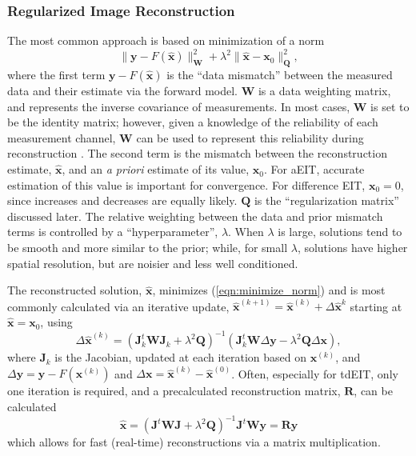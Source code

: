 \documentclass[10pt,journal]{IEEEtran}\def\TBLWIDA{15mm}\def\TBLWIDB{60mm}
\newcommand{\xB}{\mathbf{x}}
\newcommand{\xH}{\hat{\mathbf{x}}}
\newcommand{\yB}{\mathbf{y}}
\newcommand{\RB}{\mathbf{R}}
\newcommand{\QB}{\mathbf{Q}}
\newcommand{\WB}{\mathbf{W}}
\newcommand{\JB}{\mathbf{J}}
\begin{document}
\subsubsection{Regularized Image Reconstruction}
The most common approach is based
on minimization of a norm
\begin{equation}
\| \yB - F(\xH) \|^2_\WB + \lambda^2\| \xH - \xB_0 \|^2_\QB,
\label{eqn:minimize_norm}
\end{equation}
where the first term $\yB - F(\xH)$ is the ``data mismatch''
between the measured data and their estimate via the forward model.
$\WB$ is a data weighting matrix, and represents the inverse
covariance of measurements. In most cases, $\WB$ is set to be the identity matrix;
however, given a knowledge of the reliability of each measurement channel, 
$\WB$ can be used to represent this reliability during
reconstruction \cite{Mamatjan2013Quality}.
The second term is the mismatch between the reconstruction
estimate, $\xH$, and an {\em a priori} estimate of its value, $\xB_0$.
For aEIT, accurate estimation of this value is important for convergence.
For difference EIT, $\xB_0=0$, since increases and decreases are
equally likely.
$\QB$ is the ``regularization matrix'' discussed later.
The relative weighting between the data and prior mismatch terms 
is controlled by a ``hyperparameter'', $\lambda$. When $\lambda$ is
large, solutions tend to be smooth and more similar to the prior;
while, for small $\lambda$, solutions have higher spatial resolution,
but are noisier and less well conditioned.

The reconstructed solution, $\xH$, minimizes (\ref{eqn:minimize_norm})
and is most commonly calculated via
an iterative update, $\xH^{(k+1)} = \xH^{(k)} + \Delta\xH^{k}$ 
starting at $\xH = \xB_0$, using
\begin{equation}
\Delta\xH^{(k)}= 
 \left( \JB_k^t \WB \JB_k + \lambda^2 \QB \right)^{-1}
       \left( \JB_k^t \WB \Delta \yB - 
      \lambda^2 \QB     \Delta \xB \right),
\label{eqn:iterative_update}
\end{equation}
where $\JB_k$ is the Jacobian, updated at each iteration based on 
$\xB^{(k)}$,
and $\Delta\yB = \yB - F(\xB^{(k)})$ 
and $\Delta\xB = \xH^{(k)} - \xH^{(0)}$.
Often, especially for tdEIT, only one iteration is required,
and a precalculated reconstruction matrix, $\RB$, can be
calculated
\begin{equation}
\xH= \left( \JB^t \WB \JB + \lambda^2 \QB \right)^{-1}
      \JB^t \WB \yB = \RB \yB
\label{eqn:linear_reconstruction}
\end{equation}
which allows for fast (real-time) reconstructions via a matrix multiplication.
\end{document}
